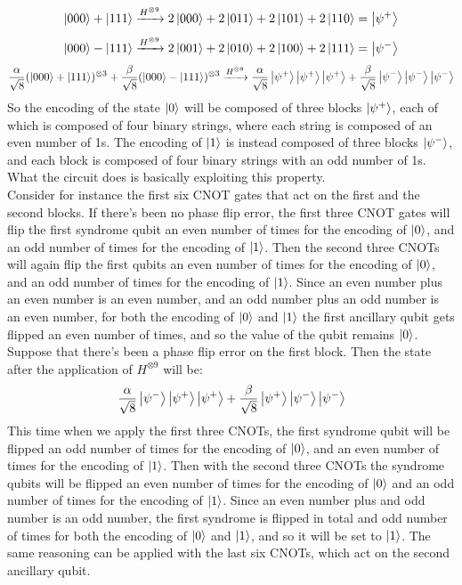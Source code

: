 \documentclass{article}
\begin{document}
	\[ \ket{000} + \ket{111} \xrightarrow{H^{\otimes 9}} 2\ket{000} + 2\ket{011} + 2\ket{101} + 2\ket{110} = \ket{\psi^+} \]
	\[  \ket{000} - \ket{111} \xrightarrow{H^{\otimes 9}} 2\ket{001} + 2\ket{010} + 2\ket{100} + 2\ket{111} = \ket{\psi^-} \]
	\[\frac{\alpha}{\sqrt{8}}(\ket{000} + \ket{111})^{\otimes 3} + \frac{\beta}{\sqrt{8}}(\ket{000} - \ket{111})^{\otimes 3} \xrightarrow{H^{\otimes 9}} \frac{\alpha}{\sqrt{8}}\ket{\psi^+}\ket{\psi^+}\ket{\psi^+} + \frac{\beta}{\sqrt{8}}\ket{\psi^-}\ket{\psi^-}\ket{\psi^-} \]
	So the encoding of the state $\ket{0}$ will be composed of three blocks $\ket{\psi^+}$, each of which is composed of four binary strings, where each string is composed of an even number of 1s. The encoding of $\ket{1}$ is instead composed of three blocks $\ket{\psi^-}$, and each block is composed of four binary strings with an odd number of 1s. What the circuit does is basically exploiting this property.\\
	Consider for instance the first six CNOT gates that act on the first and the second blocks. If there's been no phase flip error, the first three CNOT gates will flip the first syndrome qubit an even number of times for the encoding of $\ket{0}$, and an odd number of times for the encoding of $\ket{1}$. Then the second three CNOTs will again flip the first qubits an even number of times for the encoding of $\ket{0}$, and an odd number of times for the encoding of $\ket{1}$. Since an even number plus an even number is an even number, and an odd number plus an odd number is an even number, for both the encoding of $\ket{0}$ and $\ket{1}$ the first ancillary qubit gets flipped an even number of times, and so the value of the qubit remains $\ket{0}$. \\
	Suppose that there's been a phase flip error on the first block. Then the state after the application of $H^{\otimes 9}$ will be:
	\[ \frac{\alpha}{\sqrt{8}}\ket{\psi^-}\ket{\psi^+}\ket{\psi^+} + \frac{\beta}{\sqrt{8}}\ket{\psi^+}\ket{\psi^-}\ket{\psi^-}\]
	This time when we apply the first three CNOTs, the first syndrome qubit will be flipped an odd number of times for the encoding of $\ket{0}$, and an even number of times for the encoding of $\ket{1}$. Then with the second three CNOTs the syndrome qubits will be flipped an even number of times for the encoding of $\ket{0}$ and an odd number of times for the encoding of $\ket{1}$. Since an even number plus and odd number is an odd number, the first syndrome is flipped in total and odd number of times for both the encoding of $\ket{0}$ and $\ket{1}$, and so it will be set to $\ket{1}$. The same reasoning can be applied with the last six CNOTs, which act on the second ancillary qubit.\\
\end{document}
